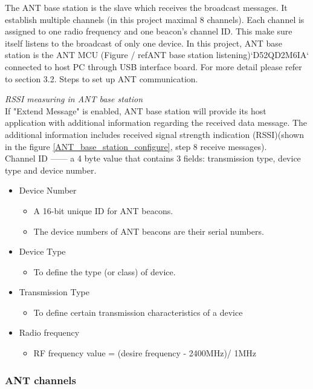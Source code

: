 \documentclass{article}
\begin{document}
The ANT base station is the slave which receives the broadcast messages. It establish multiple channels (in this project maximal 8 channels). Each channel is assigned to one radio frequency and one beacon's channel ID. This make sure itself listens to the broadcast of only one device. In this project, ANT base station is the ANT MCU (Figure / ref{ANT base station listening})`D52QD2M6IA` connected to host PC through USB interface board.  For more detail please refer to section 3.2. Steps to set up ANT communication.

 \textit{RSSI measuring in ANT base station} \\
 If "Extend Message" is enabled, ANT base station will provide its host application with additional information regarding the received data message. The additional information  includes received signal strength indication (RSSI)(shown in the figure \ref{ANT_base_station_configure}, step 8 receive messages). \\
 
Channel ID —— a 4 byte value that contains 3 fields: transmission type, device type  and device number.

\begin{itemize}
\item   Device Number
	\begin{itemize}
	\item  A 16-bit unique ID for ANT beacons.
	\item  The device numbers of ANT beacons are their serial numbers.
	\end{itemize}
\item Device Type
	\begin{itemize}
	\item To define the type (or class) of device.
	\end{itemize}
\item Transmission Type
	\begin{itemize}
	\item To define certain transmission characteristics of a device
	\end{itemize}
\item Radio frequency
	\begin{itemize}
	\item RF frequency value = (desire frequency - 2400MHz)/ 1MHz
	\end{itemize}
\end{itemize}

     
\subsubsection{ANT channels}
\end{document}
